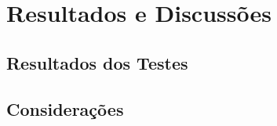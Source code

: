 
\chapter{Resultados e Discussões}
\label{sec:discussao}


\section{\textbf{Resultados dos Testes}}

\section{\textbf{Considerações}}

\lipsum[3-4] %
